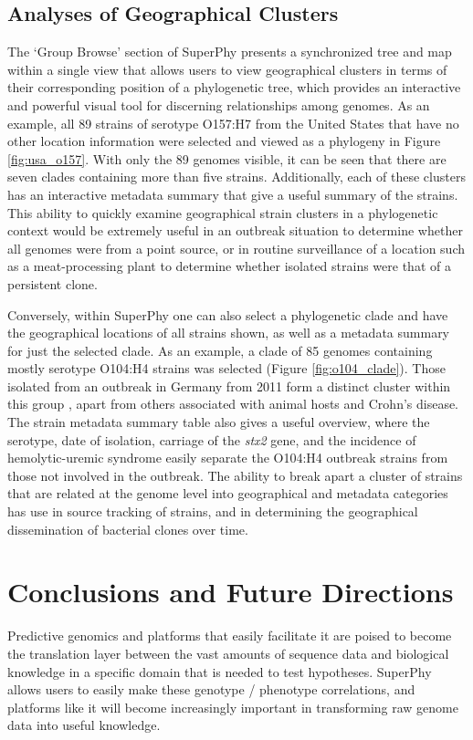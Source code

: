 \documentclass[doublespacing, linenumbers]{bmcart}
\begin{document}
\subsection{Analyses of Geographical Clusters}
The `Group Browse' section of SuperPhy presents a synchronized tree and map within a single view that allows users to view geographical clusters in terms of their corresponding position of a phylogenetic tree, which provides an interactive and powerful visual tool for discerning relationships among genomes. As an example, all 89 strains of serotype O157:H7 from the United States that have no other location information were selected and viewed as a phylogeny in Figure \ref{fig:usa_o157}.  With only the 89 genomes visible, it can be seen that there are seven clades containing more than five strains. Additionally, each of these clusters has an interactive metadata summary that give a useful summary of the strains. This ability to quickly examine geographical strain clusters in a phylogenetic context would be extremely useful in an outbreak situation to determine whether all genomes were from a point source, or in routine surveillance of a location such as a meat-processing plant to determine whether isolated strains were that of a persistent clone. 

Conversely, within SuperPhy one can also select a phylogenetic clade and have the geographical locations of all strains shown, as well as a metadata summary for just the selected clade. As an example, a clade of 85 genomes containing mostly serotype O104:H4 strains was selected (Figure \ref{fig:o104_clade}). Those isolated from an outbreak in Germany from 2011 form a distinct cluster within this group \cite{mellmann_prospective_2011}, apart from others associated with animal hosts and Crohn's disease. The strain metadata summary table also gives a useful overview, where the serotype, date of isolation, carriage of the \textit{stx2} gene, and the incidence of hemolytic-uremic syndrome easily separate the O104:H4 outbreak strains from those not involved in the outbreak. The ability to break apart a cluster of strains that are related at the genome level into geographical and metadata categories has use in source tracking of strains, and in determining the geographical dissemination of bacterial clones over time.

\section{Conclusions and Future Directions}
Predictive genomics and platforms that easily facilitate it are poised to become the translation layer between the vast amounts of sequence data and biological knowledge in a specific domain that is needed to test hypotheses. SuperPhy allows users to easily make these genotype / phenotype correlations, and platforms like it will become increasingly important in transforming raw genome data into useful knowledge. 
\end{document}
